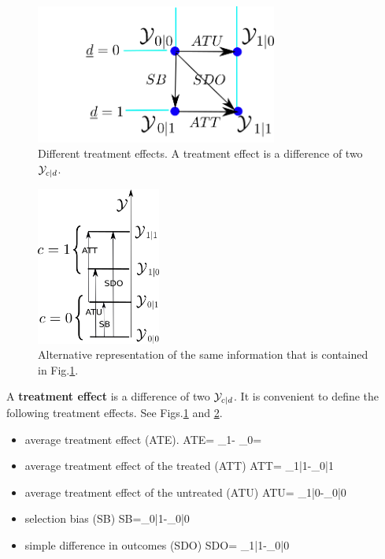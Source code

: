 \begin{figure}[h!]
\centering
\includegraphics[height=1.8in]
{pot-out/y-diffs-square.png}
\caption{Different treatment effects.
A treatment effect is a difference of
two ${\cal Y}_{c| d }$.}
\label{fig-y-diffs-square}
\end{figure}

\begin{figure}[h!]
\centering
\includegraphics[width=1.6in]
{pot-out/po-y-levels.png}
\caption{Alternative
representation of the same
information that is contained in
Fig.\ref{fig-y-diffs-square}.}
\label{fig-po-y-levels}
\end{figure}

A {\bf treatment effect} is a
difference of two  ${\cal Y}_{c| d }$.
It is convenient to
define the following
treatment effects.
See Figs.\ref{fig-y-diffs-square}
and \ref{fig-po-y-levels}.




\begin{itemize}


\item average treatment effect
 (ATE).
\beq
{\color{red}ATE}=
\caly_{1}-
\caly_{0}= \delta
\eeq

\item average treatment effect
of the treated (ATT)
\beq
{\color{red}ATT}=
\caly_{1|1}-\caly_{0|1}
\eeq


\item average
treatment effect of the untreated (ATU)
\beq
{\color{red}ATU}=
\caly_{1|0}-\caly_{0|0}
\eeq

\item selection bias (SB)
\beq
{\color{red}SB}=\caly_{0|1}-\caly_{0|0}
\eeq


\item simple difference in outcomes (SDO)
\beq
{\color{red} SDO}= \caly_{1|1}-\caly_{0|0}
\eeq


\end{itemize}



